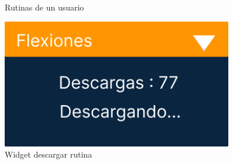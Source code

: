 \begin{figure}[H]
\begin{minipage}{0.45\textwidth}
      \caption{Rutinas de un usuario}
      \label{fig:Rutinas de un usuario}
   \end{minipage}%
   \hspace{0.5cm}
   \begin{minipage}{0.45\textwidth}
      \centering
      \includegraphics[width=0.9\textwidth]{fotos/Frame 57.png}
      \caption{Widget descargar rutina}
      \label{fig:Widget descargar rutina}
   \end{minipage}
\end{figure}

